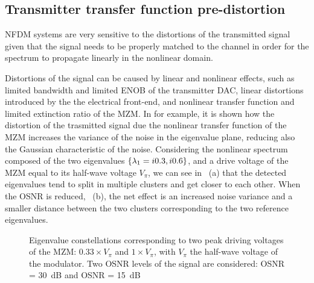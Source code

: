 \subsection{Transmitter transfer function pre-distortion}\label{sec:nfdm_tx_pre-distortion}
\ac{NFDM} systems are very sensitive to the distortions of the transmitted signal given that the signal needs to be properly matched to the channel in order for the spectrum to propagate linearly in the nonlinear domain.

Distortions of the signal can be caused by linear and nonlinear effects, such as
limited bandwidth and limited \ac{ENOB} of the transmitter \ac{DAC}, linear distortions introduced by the  the electrical
front-end, and nonlinear transfer function and limited extinction ratio of the
\ac{MZM}. In  for example, it is shown how the
distortion of the trasmitted signal due the nonlinear transfer function of the
\ac{MZM} increases the variance of the noise in the eigenvalue plane, reducing also the Gaussian characteristic of the noise. Considering the nonlinear spectrum composed of the two eigenvalues $\{\eig[1]=\iunit0.3, \iunit0.6\}$, and a drive voltage of the \ac{MZM} equal to its half-wave voltage $V_{\pi}$, we can see in ~(a) that the detected eigenvalues tend to split in multiple clusters and get closer to each other. When the \ac{OSNR} is reduced, ~(b), the net effect is an increased noise variance and a smaller distance between the two clusters corresponding to the two reference eigenvalues.

\begin{figure}[!htb]
  \centering
  \caption{Eigenvalue constellations corresponding to two peak driving voltages of the \ac{MZM}: $0.33\times V_{\pi}$ and $1 \times V_{\pi}$, with $V_{\pi}$ the half-wave voltage of the modulator. Two \ac{OSNR} levels of the signal are considered:  \ac{OSNR} = \SI{30}{\dB} and  \ac{OSNR} = \SI{15}{\dB}}
  \label{fig:mzm_distortion}
\end{figure}

